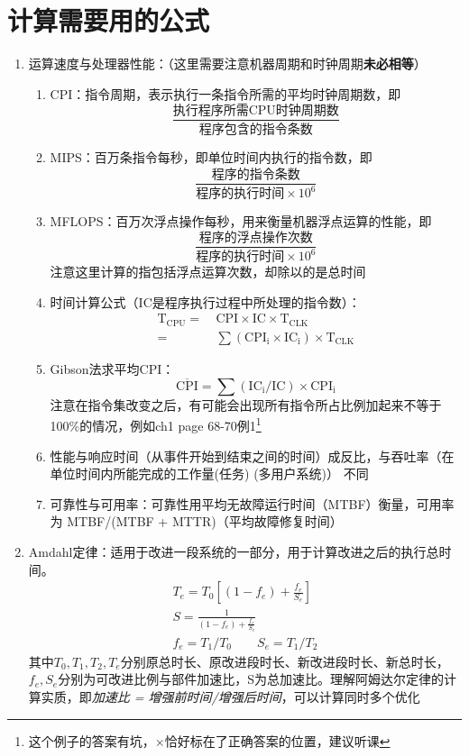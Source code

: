 \documentclass[]{report}
\begin{document}
	\section{计算需要用的公式}
	\begin{enumerate}[label = \textsf{\arabic{*}}]
		\item 运算速度与处理器性能：（这里需要注意机器周期和时钟周期\textbf{未必相等}）\par
		\begin{enumerate}
			\item CPI：指令周期，表示执行一条指令所需的平均时钟周期数，即\[\frac{\mbox{执行程序所需CPU时钟周期数}}{\mbox{程序包含的指令条数}}\]
			\item MIPS：百万条指令每秒，即单位时间内执行的指令数，即\[\frac{\mbox{程序的指令条数}}{\mbox{程序的执行时间}\times10^6}\]
			\item MFLOPS：百万次浮点操作每秒，用来衡量机器浮点运算的性能，即\[\frac{\mbox{程序的浮点操作次数}}{\mbox{程序的执行时间}\times10^6}\]注意这里计算的指包括浮点运算次数，却除以的是总时间
			\item 时间计算公式（IC是程序执行过程中所处理的指令数）：\[\begin{aligned} \mathrm{T_{CPU}}=\ &\mathrm{CPI}\times\mathrm{IC}\times\mathrm{T_{CLK}}\\ =\ &\sum(\mathrm{CPI_i}\times\mathrm{IC_i})\times\mathrm{T_{CLK}}\end{aligned}\]
			\item Gibson法求平均CPI：\[\overline{\mathrm{CPI}}=\sum(\mathrm{IC_i/IC})\times \mathrm{CPI_i}\]注意在指令集改变之后，有可能会出现所有指令所占比例加起来不等于100\%的情况，例如ch1 page 68-70例1\footnote{这个例子的答案有坑，$\times$恰好标在了正确答案的位置，建议听课}
			\item 性能与响应时间（从事件开始到结束之间的时间）成反比，与吞吐率（在单位时间内所能完成的工作量(任务) (多用户系统)）	不同
			\item 可靠性与可用率：可靠性用平均无故障运行时间（MTBF）衡量，可用率为 MTBF/(MTBF + MTTR)（平均故障修复时间）
		\end{enumerate}
		\item Amdahl定律：适用于改进一段系统的一部分，用于计算改进之后的执行总时间。\[\begin{gathered}
			T_e=T_0[(1-f_e)+\frac{f_e}{S_e}]\\
			S=\frac{1}{(1-f_e)+\frac{f_e}{S_e}}\\
			f_e=T_1/T_0\qquad S_e=T_1/T_2
		\end{gathered}\]其中$T_0,T_1,T_2,T_e$分别原总时长、原改进段时长、新改进段时长、新总时长，$f_e,S_e$分别为可改进比例与部件加速比，S为总加速比。理解阿姆达尔定律的计算实质，即\textit{加速比 = 增强前时间/增强后时间}，可以计算同时多个优化

\end{enumerate}
\end{document}

